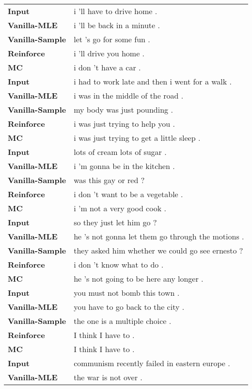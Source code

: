 \begin{table*}[!htb]
\centering
\footnotesize
\begin{tabular}{p{4cm}p{8cm}}\toprule

{\bf Input}&i 'll have to drive home .\\
{\bf Vanilla-MLE}&i 'll be back in a minute .\\
{\bf Vanilla-Sample}&let 's go for some fun .\\
{\bf Reinforce}&i 'll drive you home .\\
{\bf MC}&i don 't have a car .\\\midrule
{\bf Input}&i had to work late and then i went for a walk .\\
{\bf Vanilla-MLE}&i was in the middle of the road .\\
{\bf Vanilla-Sample}&my body was just pounding .\\
{\bf Reinforce}&i was just trying to help you .\\
{\bf MC}&i was just trying to get a little sleep .\\\midrule
{\bf Input}&lots of cream lots of sugar .\\
{\bf Vanilla-MLE}&i 'm gonna be in the kitchen .\\
{\bf Vanilla-Sample}&was this gay or red ?\\
{\bf Reinforce}&i don 't want to be a vegetable .\\
{\bf MC}&i 'm not a very good cook .\\\midrule
{\bf Input}&so they just let him go ?\\
{\bf Vanilla-MLE}&he 's not gonna let them go through the motions .\\
{\bf Vanilla-Sample}&they asked him whether we could go see ernesto ?\\
{\bf Reinforce}&i don 't know what to do .\\
{\bf MC}&he 's not going to be here any longer .\\\midrule
{\bf Input}&you must not bomb this town .\\
{\bf Vanilla-MLE}&you have to go back to the city .\\
{\bf Vanilla-Sample}&the one is a multiple choice .\\
{\bf Reinforce}&I think I have to .\\
{\bf MC}&I think I have to .\\\midrule
{\bf Input}&communism recently failed in eastern europe .\\
{\bf Vanilla-MLE}&the war is not over .\\

\end{tabular}
\end{table*}
